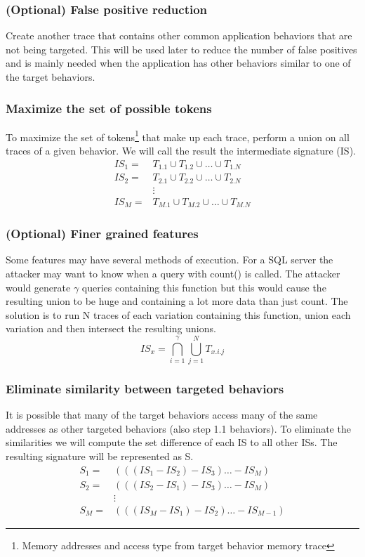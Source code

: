 \documentclass[11pt, oneside]{article}
\begin{document}
\subsubsection{(Optional) False positive reduction}
Create another trace that contains other common application behaviors that are 
not being targeted. This will be used later to reduce the number of false 
positives and is mainly needed when the application has other behaviors 
similar to one of the target behaviors.

\subsubsection{Maximize the set of possible tokens}
To maximize the set of tokens\footnote{Memory addresses and access type from 
target behavior memory trace} that make up each trace, perform a union on all 
traces of a given behavior.  We will call the result the intermediate 
signature (IS).
\begin{align*}
IS_1 =& T_{1.1}\cup T_{1.2}\cup\ldots\cup T_{1.N} \\
IS_2 =& T_{2.1}\cup T_{2.2}\cup\ldots\cup T_{2.N} \\
      &\vdots \\
IS_M =& T_{M.1}\cup T_{M.2}\cup\ldots\cup T_{M.N}
\end{align*}

\subsubsection{(Optional) Finer grained features}
Some features may have several methods of execution. For a SQL server the 
attacker may want to know when a query with count() is called. The attacker 
would generate $\gamma$ queries containing this function but this would cause 
the resulting union to be huge and containing a lot more data than just count. 
The solution is to run N traces of each variation containing this function, 
union each variation and then intersect the resulting unions. \\
$$IS_x = \bigcap_{i=1}^{\gamma}\bigcup_{j=1}^{N}T_{x.i.j}$$

\subsubsection{Eliminate similarity between targeted behaviors}
It is possible that many of the target behaviors access many of the same 
addresses as other targeted behaviors (also step 1.1 behaviors). To eliminate 
the similarities we will compute the set difference of each IS to all other 
ISs. The resulting signature will be represented as S. \\
\begin{align*}
S_1 =& (((IS_1 - IS_2) - IS_3)\ldots - IS_M) \\
S_2 =& (((IS_2 - IS_1) - IS_3)\ldots - IS_M) \\
    &\vdots \\
S_M =& (((IS_M - IS_1) - IS_2)\ldots - IS_{M-1})
\end{align*}
\end{document}
